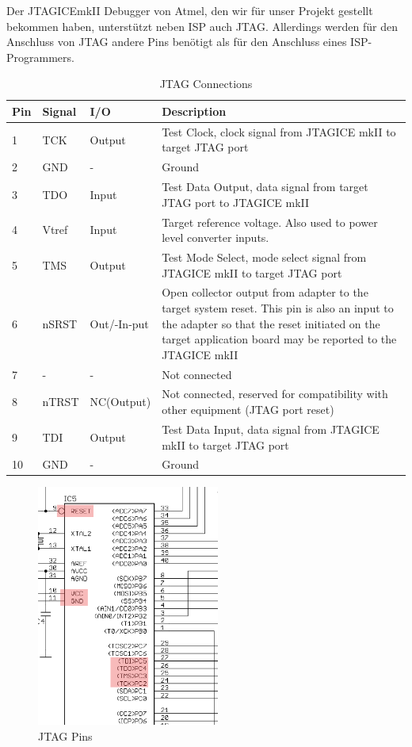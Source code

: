Der JTAGICEmkII Debugger von Atmel, den wir für unser Projekt gestellt bekommen
haben, unterstützt neben ISP auch \ac{JTAG}. Allerdings werden für den Anschluss von
\ac{JTAG} andere Pins benötigt als für den Anschluss eines ISP-Programmers.

\begin{table}
\begin{longtable}{|l|l|l|p{8.8cm}|}\hline 
Pin & Signal & I/O & Description \\ \hline 
1 & TCK & Output & Test Clock, clock signal from JTAGICE mkII to target JTAG port \\ \hline 
2 & GND & - & Ground \\ \hline 
3 & TDO & Input & Test Data Output, data signal from target JTAG port to JTAGICE mkII \\ \hline 
4 & Vtref & Input & Target reference voltage. Also used to power level converter inputs. \\ \hline 
5 & TMS & Output & Test Mode Select, mode select signal from JTAGICE mkII to target JTAG port \\ \hline 
6 & nSRST & Out/-In-put & Open collector output from adapter to the target system reset. This pin is also an input to the adapter so that the reset initiated on the target application board may be reported to the JTAGICE mkII \\ \hline 
7 & - & - & Not connected \\ \hline 
8 & nTRST & NC(Output) & Not connected, reserved for compatibility with other equipment (JTAG port reset) \\ \hline 
9 & TDI & Output & Test Data Input, data signal from JTAGICE mkII to target JTAG port \\ \hline 
10 & GND & - & Ground \\ \hline 
\end{longtable}
\caption{JTAG Connections \cite{JTAGICEmkII.Quick}}
\label{jtag.Connections}
\end{table}

\begin{figure}[htp]
\begin{center}
  \includegraphics[width=6cm]{content/pictures/jatgPins.png}
  \caption{JTAG Pins}
  \label{jtag.pins}
\end{center}
\end{figure}


